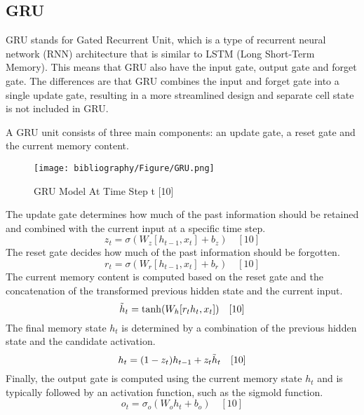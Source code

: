 \documentclass{ieeeojies}
\begin{document}
\subsection{GRU}
GRU stands for Gated Recurrent Unit, which is a type of recurrent neural network (RNN) architecture that is similar to LSTM (Long Short-Term Memory). This means that GRU also have the input gate, output gate and forget gate. The differences are that GRU combines the input and forget gate into a single update gate, resulting in a more streamlined design and separate cell state is not included in GRU.

A GRU unit consists of three main components: an update gate, a reset gate and the current memory content.

\begin{figure}[H]
  \centering
  \begin{minipage}{0.8\linewidth}
    \centering
    \texttt{[image: bibliography/Figure/GRU.png]}
    \caption{GRU Model At Time Step t [10]}
    \label{fig10}
  \end{minipage}
\end{figure}

The update gate determines how much of the past information should be retained and combined with the current input at a specific time step.
\[z_t = \sigma(W_z[h_{t-1},x_t] + b_z)\quad[10]\]
The reset gate decides how much of the past information should be forgotten.
\[r_t = \sigma(W_r[h_{t-1},x_t] + b_r)\quad[10]\]
The current memory content is computed based on the reset gate and the concatenation of the transformed previous hidden state and the current input.
\[\Tilde{h}_t = \tanh(W_h[r_{t}h_{t},x_t])\quad[10]\]
The final memory state $h_t$ is determined by a combination of the previous hidden state and the candidate activation.
\[h_t = (1 - z_t)h_{t-1} + z_{t}\Tilde{h}_t\quad[10]\]
Finally, the output gate is computed using the current memory state $h_t$ and is typically followed by an activation function, such as the sigmold function.
\[o_t = \sigma_o(W_{o}h_t + b_o)\quad[10]\]
\end{document}
